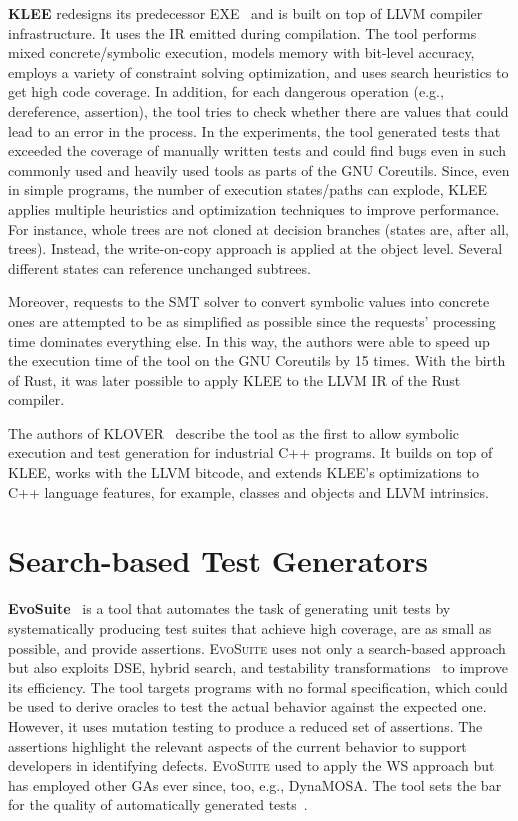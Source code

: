 \documentclass[paper=a4,%
  twoside,%
  BCOR4mm,%
  abstract=true,%
  toc=bibliography,%
  chapterprefix=true,%
  toc=bibliographynumbered,%
  open=right,%
  english,%
  pagesize=pdftex]{scrreprt}
\begin{document}
\textbf{KLEE} redesigns its predecessor \textsc{EXE}~\cite{Cadar2008} and is built on top of LLVM compiler infrastructure. It uses the \ac{IR} emitted during compilation. The tool performs mixed concrete/symbolic execution, models memory with bit-level accuracy, employs a variety of constraint solving optimization, and uses search heuristics to get high code coverage. In addition, for each dangerous operation (e.g., dereference, assertion), the tool tries to check whether there are values that could lead to an error in the process. In the experiments, the tool generated tests that exceeded the coverage of manually written tests and could find bugs even in such commonly used and heavily used tools as parts of the GNU Coreutils. Since, even in simple programs, the number of execution states/paths can explode, \textsc{KLEE} applies multiple heuristics and optimization techniques to improve performance. For instance, whole trees are not cloned at decision branches (states are, after all, trees). Instead, the write-on-copy approach is applied at the object level. Several different states can reference unchanged subtrees. 

Moreover, requests to the \ac{SMT} solver to convert symbolic values into concrete ones are attempted to be as simplified as possible since the requests' processing time dominates everything else. In this way, the authors were able to speed up the execution time of the tool on the GNU Coreutils by 15 times. With the birth of Rust, it was later possible to apply KLEE to the LLVM IR of the Rust compiler.

The authors of \textsc{KLOVER}~\cite{Li2011} describe the tool as the first to allow symbolic execution and test generation for industrial C++ programs. It builds on top of \textsc{KLEE}, works with the LLVM bitcode, and extends \textsc{KLEE}'s optimizations to C++ language features, for example, classes and objects and LLVM intrinsics.


\section{Search-based Test Generators}
\textbf{EvoSuite}~\cite{Fraser_2011} is a tool that automates the task of generating unit tests by systematically producing test suites that achieve high coverage, are as small as possible, and provide assertions. \textsc{EvoSuite} uses not only a search-based approach but also exploits \ac{DSE}, hybrid search, and testability transformations~\cite{Harman2004} to improve its efficiency. The tool targets programs with no formal specification, which could be used to derive oracles to test the actual behavior against the expected one. However, it uses mutation testing to produce a reduced set of assertions. The assertions highlight the relevant aspects of the current behavior to support developers in identifying defects. \textsc{EvoSuite} used to apply the \ac{WS} approach but has employed other \acp{GA} ever since, too, e.g., \ac{DynaMOSA}. The tool sets the bar for the quality of automatically generated tests~\cite{Vogl2021,Panichella2020,Campos2019,Fraser2018,Fraser2016,Fraser2017}.
\end{document}
